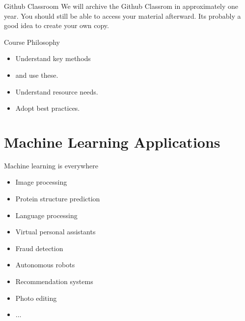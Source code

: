 \documentclass{beamer}
\begin{document}
    \begin{frame}{Github Classroom}
      We will archive the Github Classrom in approximately one year. You should still be able to
      access your material afterward. Its probably a good idea to create your own copy.
    \end{frame}

    \begin{frame}{Course Philosophy}
      \begin{itemize}
        \item Understand key methods 
        \item and use these.
        \item Understand resource needs.
        \item Adopt best practices.
      \end{itemize}
    \end{frame}

    \section{Machine Learning Applications}
    \begin{frame}{Machine learning is everywhere}
        \begin{itemize}
          \item Image processing
          \item Protein structure prediction
          \item Language processing
          \item Virtual personal assistants
          \item Fraud detection
          \item Autonomous robots
          \item Recommendation systems
          \item Photo editing
          \item $\dots$
        \end{itemize}
    \end{frame}
  
\end{document}

